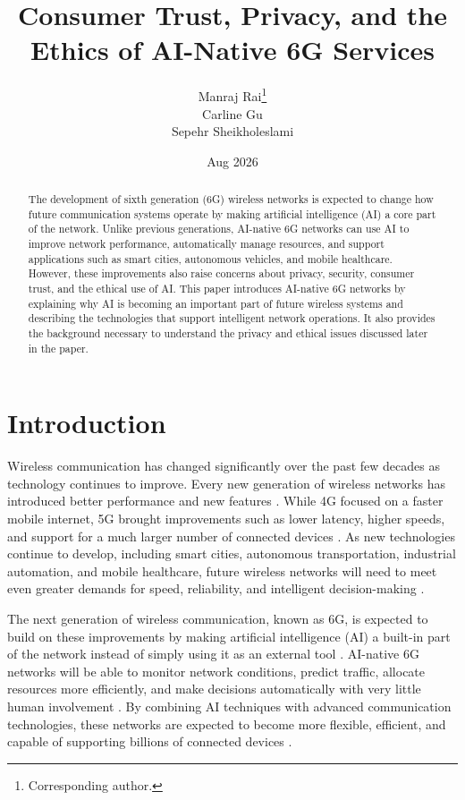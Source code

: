 \documentclass[letterpaper]{article}
\title{Consumer Trust, Privacy, and the Ethics of AI-Native 6G Services}
\author{
Manraj Rai\thanks{Corresponding author.}\\
Carline Gu\\
Sepehr Sheikholeslami
}
\date{Aug 2026}
\begin{document}
\maketitle

\begin{abstract}
The development of sixth generation (6G) wireless networks is expected to change how future communication systems operate by making artificial intelligence (AI) a core part of the network. Unlike previous generations, AI-native 6G networks can use AI to improve network performance, automatically manage resources, and support applications such as smart cities, autonomous vehicles, and mobile healthcare. However, these improvements also raise concerns about privacy, security, consumer trust, and the ethical use of AI. This paper introduces AI-native 6G networks by explaining why AI is becoming an important part of future wireless systems and describing the technologies that support intelligent network operations. It also provides the background necessary to understand the privacy and ethical issues discussed later in the paper.
\end{abstract}

\section{Introduction}
Wireless communication has changed significantly over the past few decades as technology continues to improve. Every new generation of wireless networks has introduced better performance and new features \cite{chen2023}. While 4G focused on a faster mobile internet, 5G brought improvements such as lower latency, higher speeds, and support for a much larger number of connected devices \cite{lv2025}. As new technologies continue to develop, including smart cities, autonomous transportation, industrial automation, and mobile healthcare, future wireless networks will need to meet even greater demands for speed, reliability, and intelligent decision-making \cite{wang2026}.

The next generation of wireless communication, known as 6G, is expected to build on these improvements by making artificial intelligence (AI) a built-in part of the network instead of simply using it as an external tool \cite{janbi2020}. AI-native 6G networks will be able to monitor network conditions, predict traffic, allocate resources more efficiently, and make decisions automatically with very little human involvement \cite{nurakhov2026}. By combining AI techniques with advanced communication technologies, these networks are expected to become more flexible, efficient, and capable of supporting billions of connected devices \cite{dogra2021}.
\end{document}
